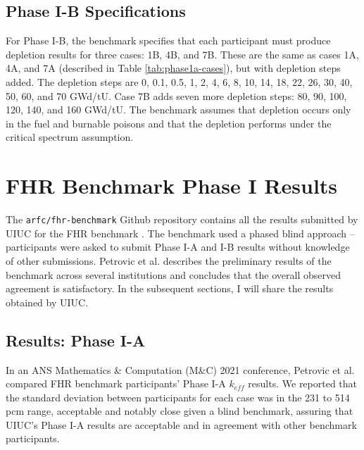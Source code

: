 \subsection{Phase I-B Specifications}
For Phase I-B, the benchmark specifies that each participant must produce 
depletion results for three cases: 1B, 4B, and 7B. 
These are the same as cases 1A, 4A, and 7A (described in Table \ref{tab:phase1a-cases}), 
but with depletion steps added. 
The depletion steps are 0, 0.1, 0.5, 1, 2, 4, 6, 8, 10, 14, 18, 22, 26, 30, 40, 50, 
60, and 70 GWd/tU. 
Case 7B adds seven more depletion steps: 80, 90, 100, 120, 140, and 160 GWd/tU. 
The benchmark assumes that depletion occurs only in the fuel and burnable poisons 
and that the depletion performs under the critical spectrum assumption. 

\section{FHR Benchmark Phase I Results}
\label{sec:fhr-phase1-results}
The \texttt{arfc/fhr-benchmark} Github repository contains all the results submitted 
by \gls{UIUC} for the \gls{FHR} benchmark \cite{chee_arfcfhr-benchmark_2021}. 
The benchmark used a phased blind approach -- participants were asked to 
submit Phase I-A and I-B results without knowledge of other submissions. 
Petrovic et al. \cite{petrovic_preliminary_2021} describes the preliminary 
results of the benchmark across several institutions and concludes 
that the overall observed agreement is satisfactory. 
In the subsequent sections, I will share the results obtained by \gls{UIUC}. 

\subsection{Results: Phase I-A}
\label{sec:fhr-benchmark-results-ia}
In an \gls{ANS} Mathematics \& Computation (M$\&$C) 2021 conference, 
Petrovic et al. \cite{petrovic_preliminary_2021} 
compared \gls{FHR} benchmark participants' Phase I-A $k_{eff}$ results.  
We reported that the standard deviation between participants for each case 
was in the 231 to 514 pcm range, acceptable and notably close given a blind 
benchmark, assuring that \gls{UIUC}'s Phase I-A results are acceptable and 
in agreement with other benchmark participants. 

